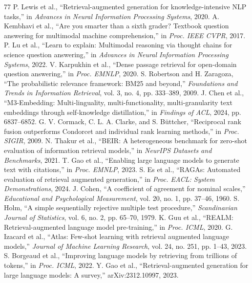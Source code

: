 \documentclass[conference]{IEEEtran}
\begin{document}
\begin{thebibliography}{77}
 P. Lewis et al., ``Retrieval-augmented generation for knowledge-intensive NLP tasks,'' in \emph{Advances in Neural Information Processing Systems}, 2020.
 A. Kembhavi et al., ``Are you smarter than a sixth grader? Textbook question answering for multimodal machine comprehension,'' in \emph{Proc. IEEE CVPR}, 2017.
 P. Lu et al., ``Learn to explain: Multimodal reasoning via thought chains for science question answering,'' in \emph{Advances in Neural Information Processing Systems}, 2022.
 V. Karpukhin et al., ``Dense passage retrieval for open-domain question answering,'' in \emph{Proc. EMNLP}, 2020.
 S. Robertson and H. Zaragoza, ``The probabilistic relevance framework: BM25 and beyond,'' \emph{Foundations and Trends in Information Retrieval}, vol. 3, no. 4, pp. 333--389, 2009.
 J. Chen et al., ``M3-Embedding: Multi-linguality, multi-functionality, multi-granularity text embeddings through self-knowledge distillation,'' in \emph{Findings of ACL}, 2024, pp. 6837--6852.
 G. V. Cormack, C. L. A. Clarke, and S. B\"uttcher, ``Reciprocal rank fusion outperforms Condorcet and individual rank learning methods,'' in \emph{Proc. SIGIR}, 2009.
 N. Thakur et al., ``BEIR: A heterogeneous benchmark for zero-shot evaluation of information retrieval models,'' in \emph{NeurIPS Datasets and Benchmarks}, 2021.
 T. Gao et al., ``Enabling large language models to generate text with citations,'' in \emph{Proc. EMNLP}, 2023.
 S. Es et al., ``RAGAs: Automated evaluation of retrieval augmented generation,'' in \emph{Proc. EACL: System Demonstrations}, 2024.
 J. Cohen, ``A coefficient of agreement for nominal scales,'' \emph{Educational and Psychological Measurement}, vol. 20, no. 1, pp. 37--46, 1960.
 S. Holm, ``A simple sequentially rejective multiple test procedure,'' \emph{Scandinavian Journal of Statistics}, vol. 6, no. 2, pp. 65--70, 1979.
 K. Guu et al., ``REALM: Retrieval-augmented language model pre-training,'' in \emph{Proc. ICML}, 2020.
 G. Izacard et al., ``Atlas: Few-shot learning with retrieval augmented language models,'' \emph{Journal of Machine Learning Research}, vol. 24, no. 251, pp. 1--43, 2023.
 S. Borgeaud et al., ``Improving language models by retrieving from trillions of tokens,'' in \emph{Proc. ICML}, 2022.
 Y. Gao et al., ``Retrieval-augmented generation for large language models: A survey,'' arXiv:2312.10997, 2023.

\end{thebibliography}
\end{document}
